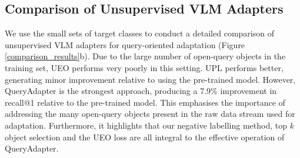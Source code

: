 \subsection{Comparison of Unsupervised VLM Adapters}
We use the small sets of target classes to conduct a detailed comparison of unsupervised VLM adapters for query-oriented adaptation (Figure \ref{comparison_results}b). Due to the large number of open-query objects in the training set, UEO performs very poorly in this setting. UPL performs better, generating minor improvement relative to using the pre-trained model. 
However, QueryAdapter is the strongest approach, producing a 7.9\% improvement in recall@1 relative to the pre-trained model. This emphasises the importance of addressing the many open-query objects present in the raw data stream used for adaptation. 
Furthermore, it highlights that our negative labelling method, top $k$ object selection and the UEO loss are all integral to the effective operation of QueryAdapter. 



